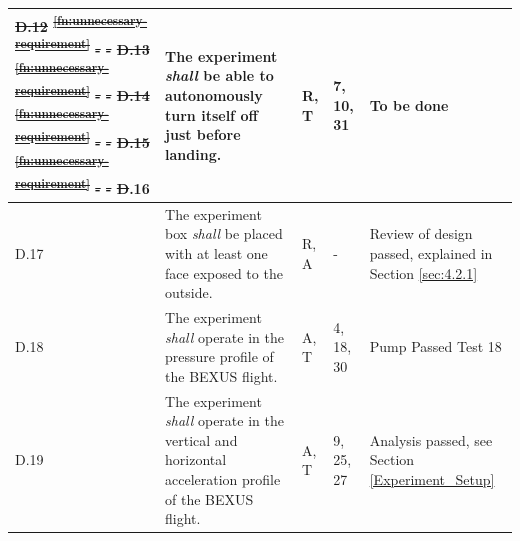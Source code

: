 \documentclass[a4paper,12pt,twoside]{article}
\providecommand{\DIFdeltex}[1]{{\protect\color{red}\sout{#1}}}                      %
\providecommand{\DIFdelend}{} %
\providecommand{\DIFdel}[1]{\texorpdfstring{\DIFdeltex{#1}}{}} %
\DeclareRobustCommand{\DIFdelend}{\DIFOaddend \let\includegraphics\DIFOincludegraphics} %
\begin{document}
\begin{longtable}[]{|m{}| m{} |m{} |m{}|m{}|}
\DIFdel{D.12 }%
\DIFdel{\textsuperscript{\ref{fn:unnecessary-requirement}}                                                                                                }%
\DIFdel{-       }%
\DIFdel{-           }%
\DIFdel{D.13 }%
\DIFdel{\textsuperscript{\ref{fn:unnecessary-requirement}}                                                                                }%
\DIFdel{-      }%
\DIFdel{-        }%
\DIFdel{D.14 }%
\DIFdel{\textsuperscript{\ref{fn:unnecessary-requirement}}                                                   }%
\DIFdel{-        }%
\DIFdel{-           }%
\DIFdel{D.15 }%
\DIFdel{\textsuperscript{\ref{fn:unnecessary-requirement}}  }%
\DIFdel{- }%
\DIFdel{-  }%
\DIFdel{D}\DIFdelend .16 & The experiment \textit{shall} be able to autonomously turn itself off just before landing.                                                                                       &       R, T      &  7, 10, 31           &    To be done    \\ \hline
D.17 & The experiment box \textit{shall} be placed with at least one face exposed to the outside.                                                                                &     R, A         & -            &   Review of design passed, explained in Section \ref{sec:4.2.1}     
\\ \hline
D.18 & The  experiment \textit{shall} operate  in  the  pressure  profile  of  the BEXUS flight.                                                                              &    A, T         & 4, 18, 30 &  Pump Passed Test 18     
\\ \hline
D.19 & The  experiment \textit{shall} operate  in  the  vertical  and  horizontal  acceleration  profile  of  the BEXUS flight.                                                                              &    A, T         & 9, 25, 27            &   Analysis passed, see Section \ref{Experiment_Setup}    

\end{longtable}
\end{document}
